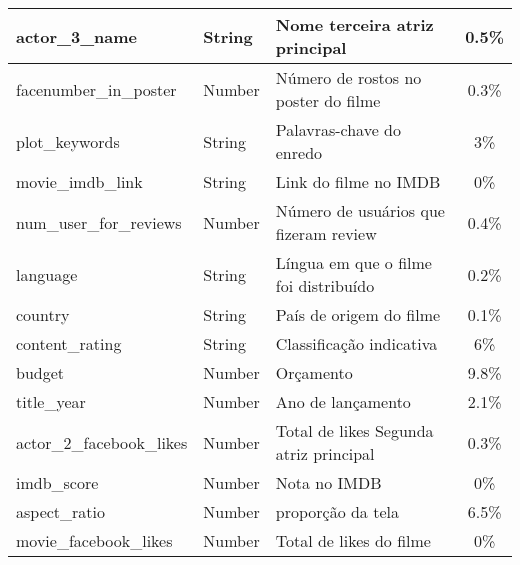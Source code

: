 \begin{longtable}{|l|l|L|c|}
actor\_3\_name               & String        & Nome terceira atriz principal           & 0.5\%                    \\ \hline
facenumber\_in\_poster       & Number        & Número de rostos no poster do filme     & 0.3\%                    \\ \hline
plot\_keywords               & String        & Palavras-chave do enredo                & 3\%                      \\ \hline
movie\_imdb\_link            & String        & Link do filme no IMDB                   & 0\%                      \\ \hline
num\_user\_for\_reviews      & Number        & Número de usuários que fizeram review   & 0.4\%                    \\ \hline
language                     & String        & Língua em que o filme foi distribuído   & 0.2\%                    \\ \hline
country                      & String        & País de origem do filme                 & 0.1\%                    \\ \hline
content\_rating              & String        & Classificação indicativa                & 6\%                      \\ \hline
budget                       & Number        & Orçamento                               & 9.8\%                    \\ \hline
title\_year                  & Number        & Ano de lançamento                       & 2.1\%                    \\ \hline
actor\_2\_facebook\_likes    & Number        & Total de likes Segunda atriz principal  & 0.3\%                    \\ \hline
imdb\_score                  & Number        & Nota no IMDB                            & 0\%                      \\ \hline
aspect\_ratio                & Number        & proporção da tela                       & 6.5\%                    \\ \hline
movie\_facebook\_likes       & Number        & Total de likes do filme              & 0\%                      \\ \hline
\end{longtable}
